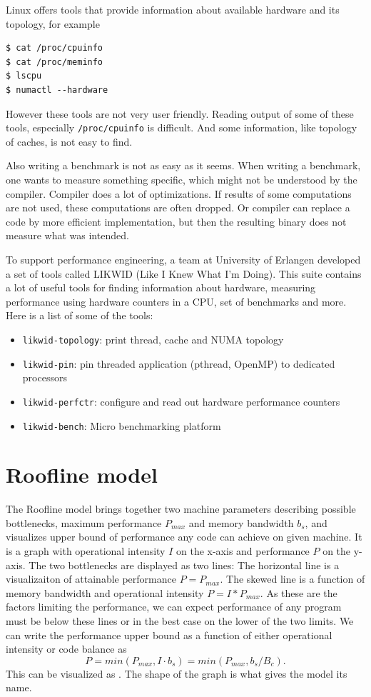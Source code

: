 {Linux offers tools that provide information about available hardware and its topology, for example
\begin{lstlisting}
$ cat /proc/cpuinfo
$ cat /proc/meminfo
$ lscpu
$ numactl --hardware
\end{lstlisting}
However these tools are not very user friendly. Reading output of some of these tools, especially \texttt{/proc/cpuinfo} is difficult. And some information, like topology of caches, is not easy to find.

Also writing a benchmark is not as easy as it seems. When writing a benchmark, one wants to measure something specific, which might not be understood by the compiler. Compiler does a lot of optimizations. If results of some computations are not used, these computations are often dropped. Or compiler can replace a code by more efficient implementation, but then the resulting binary does not measure what was intended.

To support performance engineering, a team at University of Erlangen developed a set of tools called LIKWID (Like I Knew What I’m Doing). This suite contains a lot of useful tools for finding information about hardware, measuring performance using hardware counters in a CPU, set of benchmarks and more.
Here is a list of some of the tools:

\begin{itemize}
    \item \texttt{likwid-topology}: print thread, cache and NUMA topology
    \item \texttt{likwid-pin}: pin threaded application (pthread, OpenMP) to dedicated processors
    \item \texttt{likwid-perfctr}: configure and read out hardware performance counters
    \item \texttt{likwid-bench}: Micro benchmarking platform
\end{itemize}

\section{Roofline model}

The Roofline model brings together two machine parameters describing possible bottlenecks, maximum performance $P_{max}$ and memory bandwidth $b_s$, and visualizes upper bound of performance any code can achieve on given machine.
It is a graph with operational intensity $I$ on the x-axis and performance $P$ on the y-axis. The two bottlenecks are displayed as two lines:
The horizontal line is a visualizaiton of attainable performance $P = P_{max}$.
The skewed line is a function of memory bandwidth and operational intensity $P = I * P_{max}$.
As these are the factors limiting the performance, we can expect performance of any program must be below these lines or in the best case on the lower of the two limits.
We can write the performance upper bound as a function of either operational intensity or code balance as
\begin{equation}
   P = min(P_{max}, I \cdot b_s) = min(P_{max}, b_s / B_c).
\end{equation}
This can be visualized as .
The shape of the graph is what gives the model its name.

}

